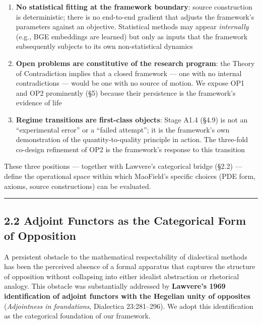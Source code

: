 \documentclass[
]{article}
\providecommand{\tightlist}{%
  \setlength{\itemsep}{0pt}\setlength{\parskip}{0pt}}
\begin{document}
\begin{enumerate}
\def\labelenumi{\arabic{enumi}.}
\tightlist
\item
  \textbf{No statistical fitting at the framework boundary}: source
  construction is deterministic; there is no end-to-end gradient that
  adjusts the framework's parameters against an objective. Statistical
  methods may appear \emph{internally} (e.g., BGE embeddings are
  learned) but only as inputs that the framework subsequently subjects
  to its own non-statistical dynamics
\item
  \textbf{Open problems are constitutive of the research program}: the
  Theory of Contradiction implies that a closed framework --- one with
  no internal contradictions --- would be one with no source of motion.
  We expose OP1 and OP2 prominently (§5) because their persistence is
  the framework's evidence of life
\item
  \textbf{Regime transitions are first-class objects}: Stage A1.4 (§4.9)
  is not an ``experimental error'' or a ``failed attempt''; it is the
  framework's own demonstration of the quantity-to-quality principle in
  action. The three-fold co-design refinement of OP2 is the framework's
  response to this transition
\end{enumerate}

These three positions --- together with Lawvere's categorical bridge
(§2.2) --- define the operational space within which MaoField's specific
choices (PDE form, axioms, source constructions) can be evaluated.

\begin{center}\rule{0.5\linewidth}{0.5pt}\end{center}

\hypertarget{adjoint-functors-as-the-categorical-form-of-opposition}{%
\subsection{2.2 Adjoint Functors as the Categorical Form of
Opposition}\label{adjoint-functors-as-the-categorical-form-of-opposition}}

A persistent obstacle to the mathematical respectability of dialectical
methods has been the perceived absence of a formal apparatus that
captures the structure of opposition without collapsing into either
idealist abstraction or rhetorical analogy. This obstacle was
substantially addressed by \textbf{Lawvere's 1969 identification of
adjoint functors with the Hegelian unity of opposites}
(\emph{Adjointness in foundations}, Dialectica 23:281--296). We adopt
this identification as the categorical foundation of our framework.
\end{document}
